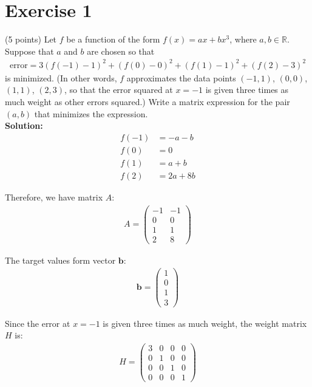 \documentclass{article}
\begin{document}
\section*{Exercise 1}
(5 points) Let $f$ be a function of the form $f(x) = ax + bx^3$, where $a, b \in \mathbb{R}$. Suppose that $a$ and $b$ are chosen so that
\begin{align*}
\text{error} = 3(f(-1) - 1)^2 + (f(0) - 0)^2 + (f(1) - 1)^2 + (f(2) - 3)^2
\end{align*}
is minimized. (In other words, $f$ approximates the data points $(-1,1)$, $(0,0)$, $(1,1)$, $(2,3)$, so that the error squared at $x = -1$ is given three times as much weight as other errors squared.) Write a matrix expression for the pair $(a, b)$ that minimizes the  expression. \\

\textbf{Solution:} \\

\begin{align*}
f(-1) &= -a - b \\
f(0) &= 0 \\
f(1) &= a + b \\
f(2) &= 2a + 8b
\end{align*}

Therefore, we have matrix $A$:
\begin{align*}
A = \begin{pmatrix} 
-1 & -1 \\ 
0 & 0 \\ 
1 & 1 \\ 
2 & 8
\end{pmatrix}
\end{align*}

The target values form vector $\mathbf{b}$:
\begin{align*}
\mathbf{b} = \begin{pmatrix} 
1 \\ 
0 \\ 
1 \\ 
3
\end{pmatrix}
\end{align*}

Since the error at $x = -1$ is given three times as much weight, the weight matrix $H$ is:
\begin{align*}
H = \begin{pmatrix} 
3 & 0 & 0 & 0 \\ 
0 & 1 & 0 & 0 \\ 
0 & 0 & 1 & 0 \\ 
0 & 0 & 0 & 1
\end{pmatrix}
\end{align*}
\end{document}
